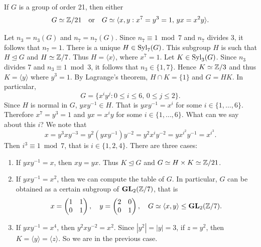 \begin{example}
\label{exa:order21}
If $G$ is a group of order 21, then either 
\[
G\simeq\mathbb{Z}/21
\quad\text{or}\quad 
G\simeq\langle x,y:x^7=y^3=1,\,yx=x^2y\rangle.
\]

Let $n_3=n_3(G)$ and $n_7=n_7(G)$. Since $n_7\equiv1\bmod 7$ and $n_7$ divides $3$, it follows that $n_7=1$. There is a unique
$H\in\mathrm{Syl}_7(G)$. This subgroup $H$ is such that
$H\unlhd G$ and $H\simeq\mathbb{Z}/7$. Thus $H=\langle x\rangle$, where
$x^7=1$.
Let $K\in\mathrm{Syl}_3(G)$. Since $n_3$ divides 7 and
$n_3\equiv1\bmod 3$, it follows that $n_3\in\{1,7\}$. 
Hence $K\simeq\mathbb{Z}/3$ and thus 
$K=\langle y\rangle$ where $y^3=1$. By Lagrange's theorem, 
$H\cap K=\{1\}$ and $G=HK$. In particular,
\[
G=\{x^iy^j:0\leq i\leq 6,\,0\leq j\leq 2\}.
\]
Since $H$ is normal in $G$, $yxy^{-1}\in H$. That is 
$yxy^{-1}=x^i$ for some $i\in\{1,\dots,6\}$. Therefore 
$x^7=y^3=1$ and  $yx=x^iy$ for some $i\in\{1,\dots,6\}$. What can we say about this $i$? We note that
\[
x=y^3xy^{-3}=y^2(yxy^{-1})y^{-2}=y^2x^iy^{-2}=yx^{i^2}y^{-1}=x^{i^3}.
\]
Then $i^3\equiv 1\bmod 7$, that is $i\in\{1,2,4\}$. There are
three cases: 
\begin{enumerate}
        \item[(a)] If $yxy^{-1}=x$, then $xy=yx$. Thus $K\unlhd G$ and $G\simeq H \times K\simeq\mathbb{Z}/21$.
        \item[(b)] If $yxy^{-1}=x^2$, then we can compute the table of $G$. In particular, $G$ can be obtained as a certain subgroup of  $\mathbf{GL}_2(\mathbb{Z}/7)$, that is 
        \[
        x=\begin{pmatrix}
        1&1\\
        0&1\end{pmatrix},
        \quad
        y=\begin{pmatrix}
        2&0\\
        0&1\end{pmatrix},
        \quad
        G\simeq\langle x,y\rangle\leq \mathbf{GL}_2(\mathbb{Z}/7).
\]
\item[(c)] If $yxy^{-1}=x^4$, then $y^2xy^{-2}=x^2$. Since $|y^2|=|y|=3$, if $z=y^2$, then 
$K=\langle y\rangle=\langle z\rangle$. 
So we are in the previous case. 
\end{enumerate}
\end{example}




